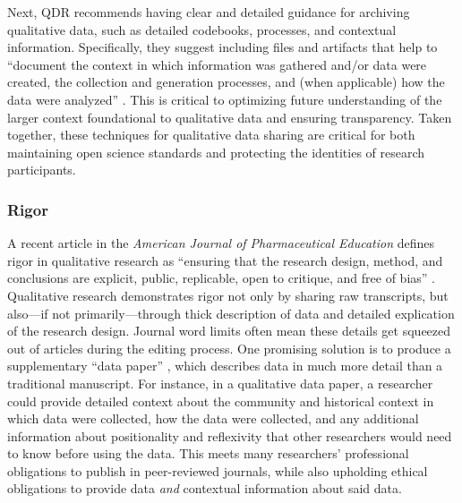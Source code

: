 \documentclass[authordate, meta, issue]{jote-new-article}
\begin{document}
Next, QDR recommends having clear and detailed guidance for archiving qualitative data, such as detailed codebooks, processes, and contextual information. Specifically, they suggest including files and artifacts that help to “document the context in which information was gathered and/or data were created, the collection and generation processes, and (when applicable) how the data were analyzed” \parencites[Documentation Files section]{QualitativeDataRepositoryND}. This is critical to optimizing future understanding of the larger context foundational to qualitative data and ensuring transparency. Taken together, these techniques for qualitative data sharing are critical for both maintaining open science standards and protecting the identities of research participants.



\subsubsection{Rigor}



A recent article in the \emph{American Journal of Pharmaceutical Education} defines rigor in qualitative research as “ensuring that the research design, method, and conclusions are explicit, public, replicable, open to critique, and free of bias” \parencites{Johnson2020}. Qualitative research demonstrates rigor not only by sharing raw transcripts, but also—if not primarily—through thick description of data and detailed explication of the research design. Journal word limits often mean these details get squeezed out of articles during the editing process. One promising solution is to produce a supplementary “data paper” \parencites{Schöpfel2019}, which describes data in much more detail than a traditional manuscript. For instance, in a qualitative data paper, a researcher could provide detailed context about the community and historical context in which data were collected, how the data were collected, and any additional information about positionality and reflexivity that other researchers would need to know before using the data. This meets many researchers’ professional obligations to publish in peer-reviewed journals, while also upholding ethical obligations to provide data \emph{and }contextual information about said data.
\end{document}
